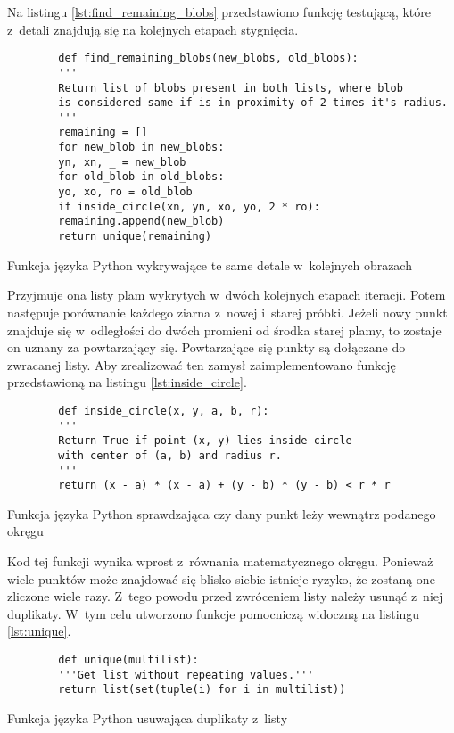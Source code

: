 Na listingu \ref{lst:find_remaining_blobs} przedstawiono funkcję testującą,
które z~detali znajdują się na kolejnych etapach stygnięcia.
\begin{listing}[htb]
	\begin{verbatim}
		def find_remaining_blobs(new_blobs, old_blobs):
		'''
		Return list of blobs present in both lists, where blob
		is considered same if is in proximity of 2 times it's radius.
		'''
		remaining = []
		for new_blob in new_blobs:
		yn, xn, _ = new_blob
		for old_blob in old_blobs:
		yo, xo, ro = old_blob
		if inside_circle(xn, yn, xo, yo, 2 * ro):
		remaining.append(new_blob)
		return unique(remaining)
	\end{verbatim}
	\caption{Funkcja języka Python wykrywające te same detale w~kolejnych
		obrazach}
	\label{lst:find_remaining_blobs}
\end{listing}
Przyjmuje ona listy plam wykrytych w~dwóch kolejnych etapach iteracji.
Potem następuje porównanie każdego ziarna z~nowej i~starej próbki.
Jeżeli nowy punkt znajduje się w~odległości do dwóch promieni od środka
starej plamy, to zostaje on uznany za powtarzający się.
Powtarzające się punkty są dołączane do zwracanej listy.
Aby zrealizować ten zamysł zaimplementowano funkcję przedstawioną na listingu
\ref{lst:inside_circle}.
\begin{listing}[htb]
	\begin{verbatim}
		def inside_circle(x, y, a, b, r):
		'''
		Return True if point (x, y) lies inside circle
		with center of (a, b) and radius r.
		'''
		return (x - a) * (x - a) + (y - b) * (y - b) < r * r
	\end{verbatim}
	\caption{Funkcja języka Python sprawdzająca czy dany punkt leży wewnątrz
		podanego okręgu}
	\label{lst:inside_circle}
\end{listing}
Kod tej funkcji wynika wprost z~równania matematycznego okręgu.
Ponieważ wiele punktów może znajdować się blisko siebie istnieje ryzyko,
że zostaną one zliczone wiele razy.
Z~tego powodu przed zwróceniem listy należy usunąć z~niej duplikaty.
W~tym celu utworzono funkcje pomocniczą widoczną na listingu \ref{lst:unique}.
\begin{listing}[htb]
	\begin{verbatim}
		def unique(multilist):
		'''Get list without repeating values.'''
		return list(set(tuple(i) for i in multilist))
	\end{verbatim}
	\caption{Funkcja języka Python usuwająca duplikaty z~listy}
	\label{lst:unique}
\end{listing}

